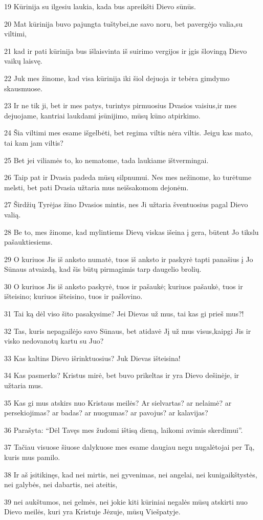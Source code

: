 \par 19 Kūrinija su ilgesiu laukia, kada bus apreikšti Dievo sūnūs. 
\par 20 Mat kūrinija buvo pajungta tuštybei,­ne savo noru, bet pavergėjo valia,­su viltimi, 
\par 21 kad ir pati kūrinija bus išlaisvinta iš suirimo vergijos ir įgis šlovingą Dievo vaikų laisvę. 
\par 22 Juk mes žinome, kad visa kūrinija iki šiol dejuoja ir tebėra gimdymo skausmuose. 
\par 23 Ir ne tik ji, bet ir mes patys, turintys pirmuosius Dvasios vaisius,­ir mes dejuojame, kantriai laukdami įsūnijimo, mūsų kūno atpirkimo. 
\par 24 Šia viltimi mes esame išgelbėti, bet regima viltis nėra viltis. Jeigu kas mato, tai kam jam viltis? 
\par 25 Bet jei viliamės to, ko nematome, tada laukiame ištvermingai. 
\par 26 Taip pat ir Dvasia padeda mūsų silpnumui. Nes mes nežinome, ko turėtume melsti, bet pati Dvasia užtaria mus neišsakomom dejonėm. 
\par 27 Širdžių Tyrėjas žino Dvasios mintis, nes Ji užtaria šventuosius pagal Dievo valią. 
\par 28 Be to, mes žinome, kad mylintiems Dievą viskas išeina į gera, būtent Jo tikslu pašauktiesiems. 
\par 29 O kuriuos Jis iš anksto numatė, tuos iš anksto ir paskyrė tapti panašius į Jo Sūnaus atvaizdą, kad šis būtų pirmagimis tarp daugelio brolių. 
\par 30 O kuriuos Jis iš anksto paskyrė, tuos ir pašaukė; kuriuos pašaukė, tuos ir išteisino; kuriuos išteisino, tuos ir pašlovino. 
\par 31 Tai ką dėl viso šito pasakysime? Jei Dievas už mus, tai kas gi prieš mus?! 
\par 32 Tas, kuris nepagailėjo savo Sūnaus, bet atidavė Jį už mus visus,­kaipgi Jis ir visko nedovanotų kartu su Juo? 
\par 33 Kas kaltins Dievo išrinktuosius? Juk Dievas išteisina! 
\par 34 Kas pasmerks? Kristus mirė, bet buvo prikeltas ir yra Dievo dešinėje, ir užtaria mus. 
\par 35 Kas gi mus atskirs nuo Kristaus meilės? Ar sielvartas? ar nelaimė? ar persekiojimas? ar badas? ar nuogumas? ar pavojus? ar kalavijas? 
\par 36 Parašyta: “Dėl Tavęs mes žudomi ištisą dieną, laikomi avimis skerdimui”. 
\par 37 Tačiau visuose šiuose dalykuose mes esame daugiau negu nugalėtojai per Tą, kuris mus pamilo. 
\par 38 Ir aš įsitikinęs, kad nei mirtis, nei gyvenimas, nei angelai, nei kunigaikštystės, nei galybės, nei dabartis, nei ateitis, 
\par 39 nei aukštumos, nei gelmės, nei jokie kiti kūriniai negalės mūsų atskirti nuo Dievo meilės, kuri yra Kristuje Jėzuje, mūsų Viešpatyje.


